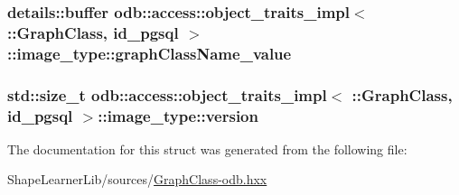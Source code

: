 \subsubsection[{graph\+Class\+Name\+\_\+value}]{\setlength{\rightskip}{0pt plus 5cm}details\+::buffer odb\+::access\+::object\+\_\+traits\+\_\+impl$<$ \+::{\bf Graph\+Class}, id\+\_\+pgsql $>$\+::image\+\_\+type\+::graph\+Class\+Name\+\_\+value}\label{structodb_1_1access_1_1object__traits__impl_3_01_1_1_graph_class_00_01id__pgsql_01_4_1_1image__type_a18034ba127460dc6552616155fc9eb17}
\hypertarget{structodb_1_1access_1_1object__traits__impl_3_01_1_1_graph_class_00_01id__pgsql_01_4_1_1image__type_a3a5ac279452f7d2466b6f9c5ce2bc340}{}
\subsubsection[{version}]{\setlength{\rightskip}{0pt plus 5cm}std\+::size\+\_\+t odb\+::access\+::object\+\_\+traits\+\_\+impl$<$ \+::{\bf Graph\+Class}, id\+\_\+pgsql $>$\+::image\+\_\+type\+::version}\label{structodb_1_1access_1_1object__traits__impl_3_01_1_1_graph_class_00_01id__pgsql_01_4_1_1image__type_a3a5ac279452f7d2466b6f9c5ce2bc340}


The documentation for this struct was generated from the following file\+:\begin{DoxyCompactItemize}
\item 
Shape\+Learner\+Lib/sources/\hyperlink{_graph_class-odb_8hxx}{Graph\+Class-\/odb.\+hxx}\end{DoxyCompactItemize}
